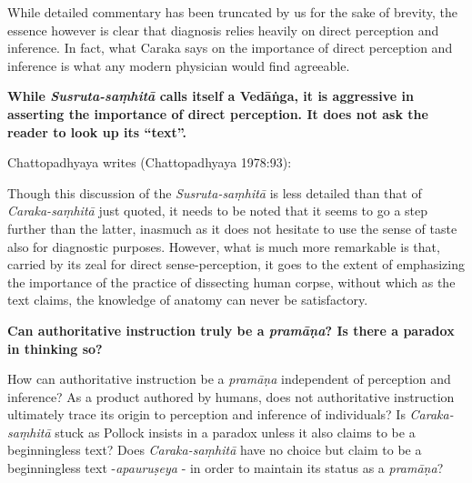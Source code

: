 While detailed commentary has been truncated by us for the sake of brevity, the essence however is clear that diagnosis relies heavily on direct perception and inference.  In fact, what Caraka says on the importance of direct perception and inference is what any modern physician would find agreeable.

{\bf While {{\sl\bfseries Susruta-saṃhitā}\relax} calls itself a Vedāṅga, it is aggressive in asserting the importance of direct perception. It does not ask the reader to look up its ``text''.}

Chattopadhyaya writes (Chattopadhyaya 1978:93):
\begin{myquote}
Though this discussion of the {\sl Susruta-saṃhitā} is less detailed than that of {\sl Caraka-saṃhitā} just quoted, it needs to be noted that it seems to go a step further than the latter, inasmuch as it does not hesitate to use the sense of taste also for diagnostic purposes.  However, what is much more remarkable is that, carried by its zeal for direct sense-perception, it goes to the extent of emphasizing the importance of the practice of dissecting human corpse, without which as the text claims, the knowledge of anatomy can never be satisfactory.
\end{myquote}

{\bf Can authoritative instruction truly be a {{\sl\bfseries pramāṇa}\relax}?  Is there a paradox in thinking so?}

How can authoritative instruction be a {\sl pramāṇa} independent of perception and inference? As a product authored by humans, does not authoritative instruction ultimately trace its origin to perception and inference of individuals? Is {\sl Caraka-saṃhitā} stuck as Pollock insists in a paradox unless it also claims to be a beginningless text?  Does {\sl Caraka-saṃhitā} have no choice but claim to be a beginningless text -{\sl apauruṣeya} - in order to maintain its status as a {\sl pramāṇa}?

